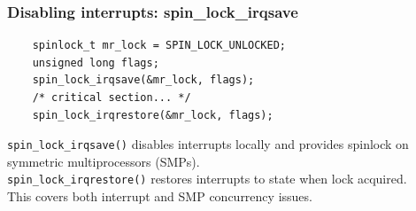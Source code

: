 \documentclass{beamer}
\newenvironment{changemargin}[1]{%
  \begin{list}{}{%
    \setlength{\topsep}{0pt}%
    \setlength{\leftmargin}{#1}%
    \setlength{\rightmargin}{1em}
    \setlength{\listparindent}{\parindent}%
    \setlength{\itemindent}{\parindent}%
    \setlength{\parsep}{\parskip}%
  }%
  \item[]}{\end{list}}
\begin{document}
\begin{frame}[fragile]
  \frametitle{Disabling interrupts: spin\_lock\_irqsave}
  \begin{lstlisting}
    spinlock_t mr_lock = SPIN_LOCK_UNLOCKED;
    unsigned long flags;
    spin_lock_irqsave(&mr_lock, flags);
    /* critical section... */
    spin_lock_irqrestore(&mr_lock, flags);
  \end{lstlisting}

  \begin{changemargin}{2cm}
    {\tt spin\_lock\_irqsave()} disables interrupts locally and provides spinlock on symmetric multiprocessors (SMPs).\\[1em]
    {\tt spin\_lock\_irqrestore()} restores interrupts to state when lock acquired.\\[1em]

    This covers both interrupt and SMP concurrency issues.\\[1em]
  \end{changemargin}
\end{frame}
\end{document}
